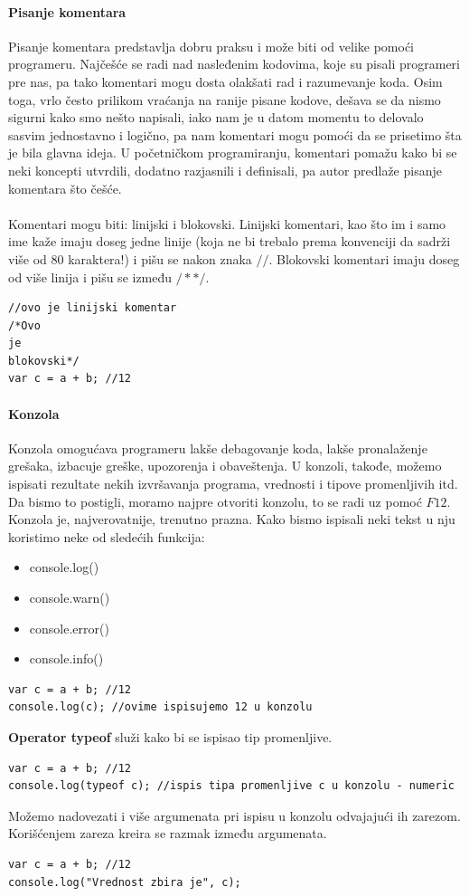 \documentclass[a4paper]{article}
\begin{document}
\paragraph{Pisanje komentara}
Pisanje komentara predstavlja dobru praksu i može biti od velike pomoći programeru. Najčešće se radi nad nasleđenim kodovima, koje su pisali programeri pre nas, pa tako komentari mogu dosta olakšati rad i razumevanje koda. Osim toga, vrlo često prilikom vraćanja na ranije pisane kodove, dešava se da nismo sigurni kako smo nešto napisali, iako nam je u datom momentu to delovalo sasvim jednostavno i logično, pa nam komentari mogu pomoći da se prisetimo šta je bila glavna ideja. U početničkom programiranju, komentari pomažu kako bi se neki koncepti utvrdili, dodatno razjasnili i definisali, pa autor predlaže pisanje komentara što češće.\\\\ 
Komentari mogu biti: linijski i blokovski. Linijski komentari, kao što im i samo ime kaže imaju doseg jedne linije (koja ne bi trebalo prema konvenciji da sadrži više od 80 karaktera!) i pišu se nakon znaka $//$. Blokovski komentari imaju doseg od više linija i pišu se između $/**/$.
\begin{verbatim}
//ovo je linijski komentar
/*Ovo 
je 
blokovski*/
var c = a + b; //12
\end{verbatim}

\paragraph{Konzola}
Konzola omogućava programeru lakše debagovanje koda, lakše pronalaženje grešaka, izbacuje greške, upozorenja i obaveštenja.
U konzoli, takođe, možemo ispisati rezultate nekih izvršavanja programa, vrednosti i tipove promenljivih itd.\\
Da bismo to postigli, moramo najpre otvoriti konzolu, to se radi uz pomoć $F12$. Konzola je, najverovatnije, trenutno prazna. Kako bismo ispisali neki tekst u nju koristimo neke od sledećih funkcija:
\begin{itemize}
    \item console.log()
    \item console.warn()
    \item console.error()
    \item console.info()
\end{itemize}
\begin{verbatim}
var c = a + b; //12
console.log(c); //ovime ispisujemo 12 u konzolu
\end{verbatim}
\textbf{Operator typeof} služi kako bi se ispisao tip promenljive.
\begin{verbatim}
var c = a + b; //12
console.log(typeof c); //ispis tipa promenljive c u konzolu - numeric
\end{verbatim}
Možemo nadovezati i više argumenata pri ispisu u konzolu odvajajući ih zarezom. Korišćenjem zareza kreira se razmak između argumenata.
\begin{verbatim}
var c = a + b; //12
console.log("Vrednost zbira je", c); 
\end{verbatim}
\end{document}
